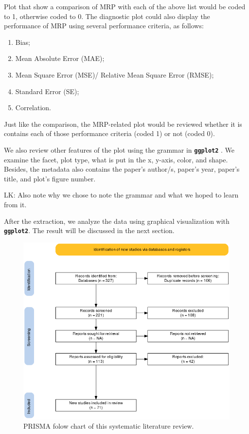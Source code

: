 \documentclass{monashthesis}
\begin{document}
Plot that show a comparison of MRP with each of the above list would be coded to 1, otherwise coded to 0.
The diagnostic plot could also display the performance of MRP using several performance criteria, as follows:

\begin{enumerate}
\def\labelenumi{\arabic{enumi}.}
\tightlist
\item
  Bias;
\item
  Mean Absolute Error (MAE);
\item
  Mean Square Error (MSE)/ Relative Mean Square Error (RMSE);
\item
  Standard Error (SE);
\item
  Correlation.
\end{enumerate}

Just like the comparison, the MRP-related plot would be reviewed whether it is contains each of those performance criteria (coded 1) or not (coded 0).

We also review other features of the plot using the grammar in \textbf{\texttt{ggplot2}} \autocite{ggplot2}. We examine the facet, plot type, what is put in the x, y-axis, color, and shape. Besides, the metadata also contains the paper's author/s, paper's year, paper's title, and plot's figure number.

LK: Also note why we chose to note the grammar and what we hoped to learn from it.

After the extraction, we analyze the data using graphical visualization with \textbf{\texttt{ggplot2}}. The result will be discussed in the next section.

\begin{figure}
\includegraphics[width=0.9\linewidth]{figures/prisma_fc} \caption{PRISMA folow chart of this systematic literature review.}\label{fig:prisma-flowchart}
\end{figure}
\end{document}
